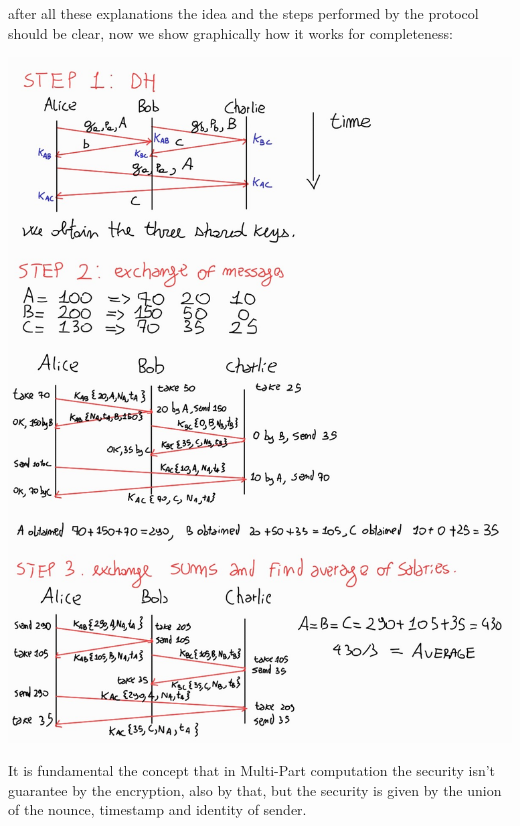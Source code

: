 \documentclass{article}
\begin{document}
after all these explanations the idea and the steps performed by the protocol should be clear, now we show graphically how it works for completeness:\\
\begin{center}
\includegraphics[scale=0.5]{HW04-1884749}
\end{center}
It is fundamental the concept that in Multi-Part computation the security isn't guarantee by the encryption, also by that, but the security is given by the union of the nounce, timestamp and identity of sender.
\end{document}
